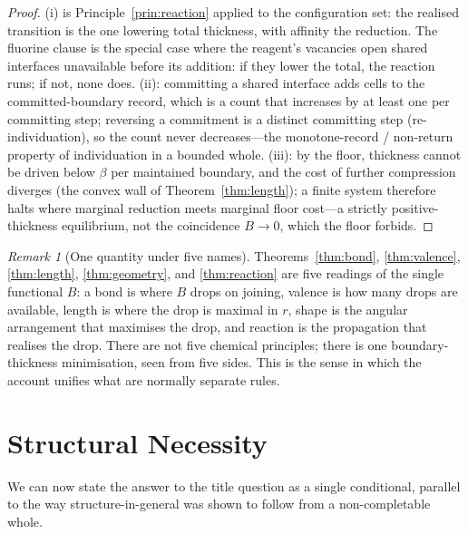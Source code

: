 \documentclass[11pt,twocolumn,a4paper]{article}
\theoremstyle{thmstyle}
\theoremstyle{definition}
\theoremstyle{remark}
\newtheorem{remark}[theorem]{Remark}
\newcommand{\floorc}{\beta}
\newcommand{\thick}{B}                 %
\begin{document}
\begin{proof}
(i) is Principle~\ref{prin:reaction} applied to the configuration set: the
realised transition is the one lowering total thickness, with affinity the
reduction. The fluorine clause is the special case where the reagent's
vacancies open shared interfaces unavailable before its addition: if they
lower the total, the reaction runs; if not, none does. (ii): committing a
shared interface adds cells to the committed-boundary record, which is a
count that increases by at least one per committing step; reversing a
commitment is a distinct committing step (re-individuation), so the count
never decreases---the monotone-record / non-return property of individuation
in a bounded whole. (iii): by the floor, thickness cannot be driven below
$\floorc$ per maintained boundary, and the cost of further compression
diverges (the convex wall of Theorem~\ref{thm:length}); a finite system
therefore halts where marginal reduction meets marginal floor cost---a
strictly positive-thickness equilibrium, not the coincidence
$\thick\to0$, which the floor forbids.
\end{proof}

\begin{remark}[One quantity under five names]
\label{rem:one-quantity}
Theorems~\ref{thm:bond}, \ref{thm:valence}, \ref{thm:length},
\ref{thm:geometry}, and \ref{thm:reaction} are five readings of the
single functional $\thick$: a bond is where $\thick$ drops on joining,
valence is how many drops are available, length is where the drop is
maximal in $r$, shape is the angular arrangement that maximises the drop,
and reaction is the propagation that realises the drop. There are not five
chemical principles; there is one boundary-thickness minimisation, seen
from five sides. This is the sense in which the account unifies what are
normally separate rules.
\end{remark}

\section{Structural Necessity}
\label{sec:why}

We can now state the answer to the title question as a single
conditional, parallel to the way structure-in-general was shown to follow
from a non-completable whole.
\end{document}
